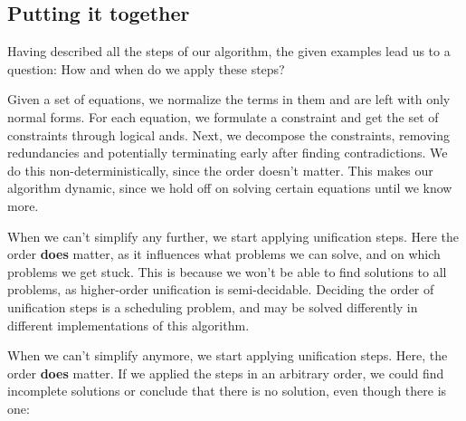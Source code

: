 \documentclass[twoside,12pt,a4paper]{article}
\begin{document}
\subsection{Putting it together}\label{sec:Putting it together}
Having described all the steps of our algorithm, the given examples lead us to a question:
How and when do we apply these steps?

Given a set of equations, we normalize the terms in them and are left with only normal forms. 
For each equation, we formulate a constraint and get the set of constraints through logical ands.
Next, we decompose the constraints, removing redundancies and potentially terminating early after finding contradictions.
We do this non-deterministically, since the order doesn't matter.
This makes our algorithm dynamic, since we hold off on solving certain equations until we know more.

When we can't simplify any further, we start applying unification steps. 
Here the order \textbf{does} matter, as it influences what problems we can solve, and on which problems we get stuck.
This is because we won't be able to find solutions to all problems, as higher-order unification is semi-decidable.
Deciding the order of unification steps is a scheduling problem, and may be solved differently in different implementations of this algorithm.

\iffalse
When we can't simplify anymore, we start applying  unification steps.
Here, the order \textbf{does} matter. If we applied the steps in an arbitrary order, 
we could find incomplete solutions or conclude that there is no solution, even though there is one:
\end{document}
